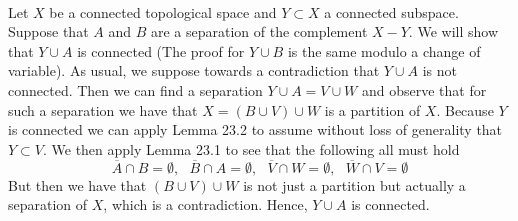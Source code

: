 \documentclass{article}
\newcommand{\problem}[1]{\noindent{\textbf{Problem #1}}\\}
\begin{document}
\problem{3.23.12} Let $X$ be a connected topological space and $Y \subset X$ a connected subspace. Suppose that $A$ and $B$ are a separation of the complement $X-Y$. We will show that $Y\cup A$ is connected (The proof for $Y\cup B$ is the same modulo a change of variable). As usual, we suppose towards a contradiction that $Y \cup A$ is not connected. Then we can find a separation $Y \cup A = V \cup W$  and observe that for such a separation we have that $X = (B \cup V) \cup W$ is a partition of $X$. Because $Y$ is connected we can apply Lemma 23.2 to assume without loss of generality that $Y \subset V$. We then apply Lemma 23.1 to see that the following all must hold
\[
\overline{A} \cap B = \emptyset, \text{ } \overline{B} \cap A = \emptyset, \text{ }\overline{V} \cap W = \emptyset, \text{ }\overline{W} \cap V = \emptyset
\]
But then we have that $(B \cup V) \cup W$ is not just a partition but actually a separation of $X$, which is a contradiction. Hence, $Y\cup A$ is connected. 
\end{document}
